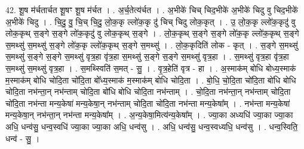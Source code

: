 \documentclass[17pt]{extarticle}
\begin{document}
42. शू॒ष म॑र्चतार्चत शू॒षꣳ शू॒ष म॑र्चत । . अ॒र्च॒तेत्य॑र्चत । . अ॒भीके॑ चिच् चिद॒भीके॑ अ॒भीके॑ चिदु वु चिद॒भीके॑ अ॒भीके॑ चिदु । . चि॒दु॒ वु॒ चि॒च् चि॒दु॒ लो॒क॒कृ ल्लो॑क॒कृ दु॑ चिच् चिदु लोक॒कृत् । . उ॒ लो॒क॒कृ ल्लो॑क॒कृदु॑ वु लोक॒कृथ् स॒ङ्गे स॒ङ्गे लो॑क॒कृदु॑ वु लोक॒कृथ् स॒ङ्गे । . लो॒क॒कृथ् स॒ङ्गे स॒ङ्गे लो॑क॒कृ ल्लो॑क॒कृथ् स॒ङ्गे स॒मथ्सु॑ स॒मथ्सु॑ स॒ङ्गे लो॑क॒कृ ल्लो॑क॒कृथ् स॒ङ्गे स॒मथ्सु॑ । . लो॒क॒कृदिति॑ लोक - कृत् । . स॒ङ्गे स॒मथ्सु॑ स॒मथ्सु॑ स॒ङ्गे स॒ङ्गे स॒मथ्सु॑ वृत्र॒हा वृ॑त्र॒हा स॒मथ्सु॑ स॒ङ्गे स॒ङ्गे स॒मथ्सु॑ वृत्र॒हा । . स॒मथ्सु॑ वृत्र॒हा वृ॑त्र॒हा स॒मथ्सु॑ स॒मथ्सु॑ वृत्र॒हा । . स॒मथ्स्विति॑ स॒मत् - सु॒ । . वृ॒त्र॒हेति॑ वृत्र - हा । . अ॒स्माक॑म् बोधि बोध्य॒स्माक॑ म॒स्माक॑म् बोधि चोदि॒ता चो॑दि॒ता बो᳚ध्य॒स्माक॑ म॒स्माक॑म् बोधि चोदि॒ता । . बो॒धि॒ चो॒दि॒ता चो॑दि॒ता बो॑धि बोधि चोदि॒ता नभ॑न्ता॒न् नभ॑न्ताम् चोदि॒ता बो॑धि बोधि चोदि॒ता नभ॑न्ताम् । . चो॒दि॒ता नभ॑न्ता॒न् नभ॑न्ताम् चोदि॒ता चो॑दि॒ता नभ॑न्ता मन्य॒केषा॑ मन्य॒केषा॒न् नभ॑न्ताम् चोदि॒ता चो॑दि॒ता नभ॑न्ता मन्य॒केषा᳚म् । . नभ॑न्ता मन्य॒केषा॑ मन्य॒केषा॒न् नभ॑न्ता॒न् नभ॑न्ता मन्य॒केषा᳚म् । . अ॒न्य॒केषा॒मित्य॑न्य॒केषा᳚म् । . ज्या॒का अध्यधि॑ ज्या॒का ज्या॒का अधि॒ धन्व॑सु॒ धन्व॒स्वधि॑ ज्या॒का ज्या॒का अधि॒ धन्व॑सु । . अधि॒ धन्व॑सु॒ धन्व॒स्वध्यधि॒ धन्व॑सु । . धन्व॒स्विति॒ धन्व॑ - सु॒ । \newline
\pagebreak
\end{document}
